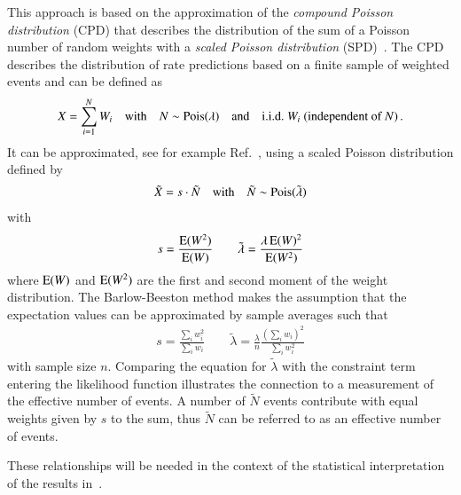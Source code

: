 This approach is based on the approximation of the \emph{compound
  Poisson distribution} (CPD) that describes the distribution of the
sum of a Poisson number of random weights with a \emph{scaled Poisson
  distribution} (SPD)~\cite{Bohm:2013gla}. The CPD describes the
distribution of rate predictions based on a finite sample of weighted
events and can be defined as
\begin{align*}
  X = \sum_{i = 1}^{N} W_i \quad \text{with} \quad N \sim \operatorname{Pois}(\lambda) \quad \text{and} \quad \text{i.i.d.\ } W_i \text{ (independent of }N\text{)} \,\text{.}
\end{align*}
It can be approximated, see for example Ref.~\cite{Bohm:2013gla},
using a scaled Poisson distribution defined by
\begin{align*}
  \tilde{X} = s \cdot \tilde{N} \quad \text{with} \quad \tilde{N} \sim \operatorname{Pois}(\tilde{\lambda})
\end{align*}
with
\begin{align*}
  s = \frac{\operatorname{E}(W^2)}{\operatorname{E}(W)} \qquad \tilde{\lambda} = \frac{\lambda \operatorname{E}(W)^2}{\operatorname{E}(W^2)}
\end{align*}
where $\operatorname{E}(W)$ and $\operatorname{E}(W^2)$ are the first and second moment
of the weight distribution. The Barlow-Beeston method makes the
assumption that the expectation values can be approximated by sample
averages such that
\begin{align*}
  s = \frac{\sum_i w_i^2}{\sum_i w_i} \qquad \tilde{\lambda} = \frac{\lambda}{n} \frac{(\sum_i w_i)^2}{\sum_i w_i^2}
\end{align*}
with sample size $n$. Comparing the equation for $\tilde{\lambda}$
with the constraint term entering the likelihood function illustrates
the connection to a measurement of the effective number of events. A
number of $\tilde{N}$ events contribute with equal weights given by
$s$ to the sum, thus $\tilde{N}$ can be referred to as an effective
number of events.

These relationships will be needed in the context of the statistical
interpretation of the results in~.


